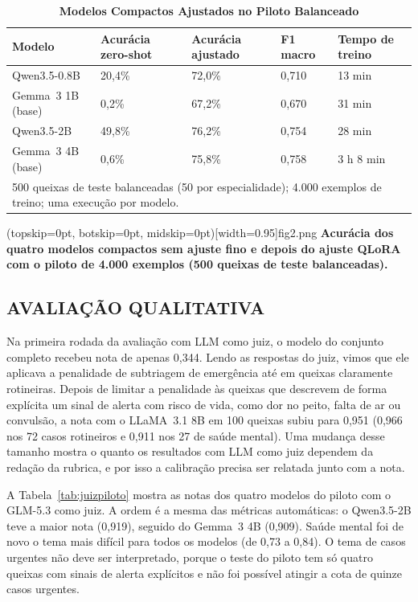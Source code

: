 \documentclass{ieeeaccess}
\begin{document}
\begin{table}[!t]
\caption{\textbf{Modelos Compactos Ajustados no Piloto Balanceado}}
\label{tab:piloto}
\setlength{\tabcolsep}{3pt}
\begin{tabular}{p{64pt}p{38pt}p{38pt}p{34pt}p{34pt}}
\hline
\textbf{Modelo} & \textbf{Acur\'acia zero-shot} & \textbf{Acur\'acia ajustado} & \textbf{F1 macro} & \textbf{Tempo de treino} \\
\hline
Qwen3.5-0.8B & 20,4\% & 72,0\% & 0,710 & 13 min \\
Gemma~3 1B (base) & 0,2\% & 67,2\% & 0,670 & 31 min \\
Qwen3.5-2B & 49,8\% & 76,2\% & 0,754 & 28 min \\
Gemma~3 4B (base) & 0,6\% & 75,8\% & 0,758 & 3 h 8 min \\
\hline
\multicolumn{5}{p{232pt}}{500 queixas de teste balanceadas (50 por especialidade); 4.000 exemplos de treino; uma execu\c{c}\~ao por modelo.}
\end{tabular}
\end{table}

\Figure[t!](topskip=0pt, botskip=0pt, midskip=0pt)[width=0.95\columnwidth]{fig2.png}
{\textbf{Acur\'acia dos quatro modelos compactos sem ajuste fino e depois do ajuste QLoRA com o piloto de 4.000 exemplos (500 queixas de teste balanceadas).}\label{fig:piloto}}

\subsection{AVALIA\c{C}\~AO QUALITATIVA}
Na primeira rodada da avalia\c{c}\~ao com LLM como juiz, o modelo do conjunto completo recebeu nota de apenas 0,344. Lendo as respostas do juiz, vimos que ele aplicava a penalidade de subtriagem de emerg\^encia at\'e em queixas claramente rotineiras. Depois de limitar a penalidade \`as queixas que descrevem de forma expl\'icita um sinal de alerta com risco de vida, como dor no peito, falta de ar ou convuls\~ao, a nota com o LLaMA~3.1 8B em 100 queixas subiu para 0,951 (0,966 nos 72 casos rotineiros e 0,911 nos 27 de sa\'ude mental). Uma mudan\c{c}a desse tamanho mostra o quanto os resultados com LLM como juiz dependem da reda\c{c}\~ao da rubrica, e por isso a calibra\c{c}\~ao precisa ser relatada junto com a nota.

A Tabela~\ref{tab:juizpiloto} mostra as notas dos quatro modelos do piloto com o GLM-5.3 como juiz. A ordem \'e a mesma das m\'etricas autom\'aticas: o Qwen3.5-2B teve a maior nota (0,919), seguido do Gemma~3 4B (0,909). Sa\'ude mental foi de novo o tema mais dif\'icil para todos os modelos (de 0,73 a 0,84). O tema de casos urgentes n\~ao deve ser interpretado, porque o teste do piloto tem s\'o quatro queixas com sinais de alerta expl\'icitos e n\~ao foi poss\'ivel atingir a cota de quinze casos urgentes.
\end{document}
